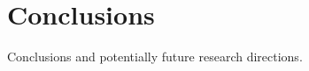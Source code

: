\section{Conclusions}
\label{sec:conclusions}

Conclusions and potentially future research directions.